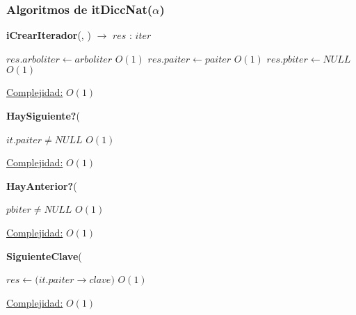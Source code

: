 \subsubsection{Algoritmos de itDiccNat($\alpha$)}

\begin{algorithm}[H]{\textbf{iCrearIterador}(, ) $\to$ $res$ : $iter$}
	\begin{algorithmic}

		\State $res.arboliter \gets arboliter$ \Comment $O(1)$
		\State $res.paiter \gets paiter$ \Comment $O(1)$
		\State $res.pbiter \gets NULL$ \Comment $O(1)$

		\medskip
		\Statex \underline{Complejidad:} $O(1)$

    \end{algorithmic}
\end{algorithm}


\begin{algorithm}[H]{\textbf{HaySiguiente?}(}
	\begin{algorithmic}

		\State $it.paiter \neq NULL$ \Comment $O(1)$

		\medskip
		\Statex \underline{Complejidad:} $O(1)$

    \end{algorithmic}
\end{algorithm}


\begin{algorithm}[H]{\textbf{HayAnterior?}(}
	\begin{algorithmic}

		\State $pbiter \neq NULL$ \Comment $O(1)$

		\medskip
		\Statex \underline{Complejidad:} $O(1)$

    \end{algorithmic}
\end{algorithm}


\begin{algorithm}[H]{\textbf{SiguienteClave}(}
	\begin{algorithmic}

		\State $res \gets (it.paiter$$\rightarrow$$clave) $ \Comment $O(1)$

		\medskip
		\Statex \underline{Complejidad:} $O(1)$

    \end{algorithmic}
\end{algorithm}


